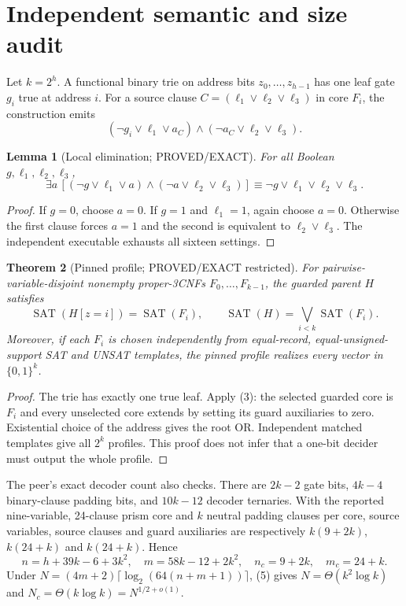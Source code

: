 \documentclass[11pt]{article}
\newtheorem{theorem}{Theorem}
\newtheorem{lemma}[theorem]{Lemma}
\newcommand{\SAT}{\operatorname{SAT}}
\begin{document}
\section{Independent semantic and size audit}
Let $k=2^h$.  A functional binary trie on address bits $z_0,\dots,z_{h-1}$
has one leaf gate $g_i$ true at address $i$.  For a source clause
$C=(\ell_1\vee\ell_2\vee\ell_3)$ in core $F_i$, the construction emits
\[
 (\neg g_i\vee\ell_1\vee a_C)\wedge
 (\neg a_C\vee\ell_2\vee\ell_3).                                  \tag{2}
\]

\begin{lemma}[Local elimination; PROVED/EXACT]
For all Boolean $g,\ell_1,\ell_2,\ell_3$,
\[
 \exists a\,[(\neg g\vee\ell_1\vee a)\wedge
 (\neg a\vee\ell_2\vee\ell_3)]
 \equiv \neg g\vee\ell_1\vee\ell_2\vee\ell_3 .                  \tag{3}
\]
\end{lemma}
\begin{proof}
If $g=0$, choose $a=0$.  If $g=1$ and $\ell_1=1$, again choose $a=0$.
Otherwise the first clause forces $a=1$ and the second is equivalent to
$\ell_2\vee\ell_3$.  The independent executable exhausts all sixteen
settings.
\end{proof}

\begin{theorem}[Pinned profile; PROVED/EXACT restricted]
For pairwise-variable-disjoint nonempty proper-3CNFs $F_0,\ldots,F_{k-1}$,
the guarded parent $H$ satisfies
\[
 \SAT(H[z=i])=\SAT(F_i),\qquad
 \SAT(H)=\bigvee_{i<k}\SAT(F_i).                                   \tag{4}
\]
Moreover, if each $F_i$ is chosen independently from equal-record,
equal-unsigned-support SAT and UNSAT templates, the pinned profile realizes
every vector in $\{0,1\}^k$.
\end{theorem}
\begin{proof}
The trie has exactly one true leaf.  Apply (3): the selected guarded core is
$F_i$ and every unselected core extends by setting its guard auxiliaries to
zero.  Existential choice of the address gives the root OR.  Independent
matched templates give all $2^k$ profiles.  This proof does not infer that a
one-bit decider must output the whole profile.
\end{proof}

The peer's exact decoder count also checks.  There are $2k-2$ gate bits,
$4k-4$ binary-clause padding bits, and $10k-12$ decoder ternaries.  With
the reported nine-variable, 24-clause prism core and $k$ neutral padding
clauses per core, source variables, source clauses and guard auxiliaries are
respectively $k(9+2k)$, $k(24+k)$ and $k(24+k)$.  Hence
\[
 n=h+39k-6+3k^2,\quad m=58k-12+2k^2,\quad
 n_c=9+2k,\quad m_c=24+k.                                           \tag{5}
\]
Under $N=(4m+2)\lceil\log_2(64(n+m+1))\rceil$, (5) gives
$N=\Theta(k^2\log k)$ and $N_c=\Theta(k\log k)=N^{1/2+o(1)}$.
\end{document}
